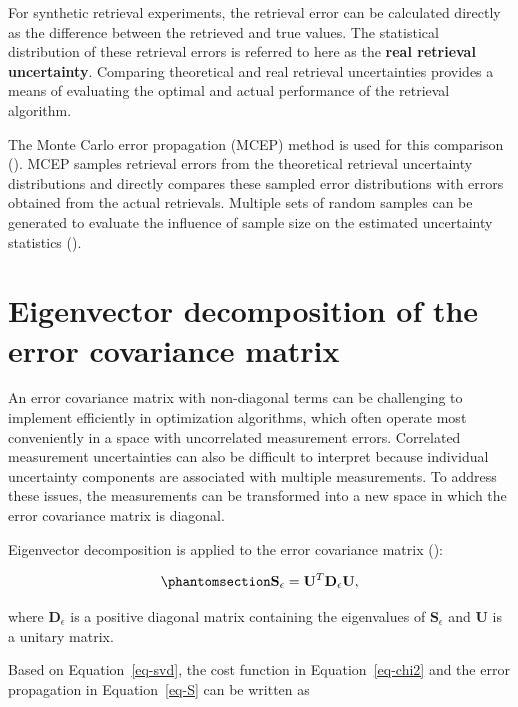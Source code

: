 \documentclass[
  11pt,
  letterpaper,
]{scrreprt}
\begin{document}
For synthetic retrieval experiments, the retrieval error can be
calculated directly as the difference between the retrieved and true
values. The statistical distribution of these retrieval errors is
referred to here as the \textbf{real retrieval uncertainty}. Comparing
theoretical and real retrieval uncertainties provides a means of
evaluating the optimal and actual performance of the retrieval
algorithm.

The Monte Carlo error propagation (MCEP) method is used for this
comparison (). MCEP samples
retrieval errors from the theoretical retrieval uncertainty
distributions and directly compares these sampled error distributions
with errors obtained from the actual retrievals. Multiple sets of random
samples can be generated to evaluate the influence of sample size on the
estimated uncertainty statistics ().

\section{Eigenvector decomposition of the error covariance
matrix}\label{sec-transform}

An error covariance matrix with non-diagonal terms can be challenging to
implement efficiently in optimization algorithms, which often operate
most conveniently in a space with uncorrelated measurement errors.
Correlated measurement uncertainties can also be difficult to interpret
because individual uncertainty components are associated with multiple
measurements. To address these issues, the measurements can be
transformed into a new space in which the error covariance matrix is
diagonal.

Eigenvector decomposition is applied to the error covariance matrix
():

\begin{equation}\phantomsection\label{eq-svd}{
\mathbf{S}_{\epsilon}
=
\mathbf{U}^{T}
\mathbf{D}_{\epsilon}
\mathbf{U},
}\end{equation}

where \(\mathbf{D}_{\epsilon}\) is a positive diagonal matrix containing
the eigenvalues of \(\mathbf{S}_{\epsilon}\) and \(\mathbf{U}\) is a
unitary matrix.

Based on Equation~\ref{eq-svd}, the cost function in
Equation~\ref{eq-chi2} and the error propagation in Equation~\ref{eq-S}
can be written as
\end{document}
